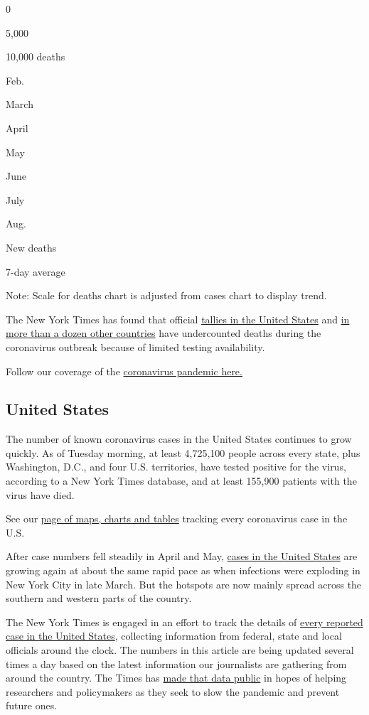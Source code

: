 0

5,000

10,000 deaths

Feb.

March

April

May

June

July

Aug.

New deaths

7-day average

Note: Scale for deaths chart is adjusted from cases chart to display
trend.

The New York Times has found that official
\href{https://www.nytimes.com/interactive/2020/04/28/us/coronavirus-death-toll-total.html}{tallies
in the United States} and
\href{https://www.nytimes.com/interactive/2020/04/21/world/coronavirus-missing-deaths.html}{in
more than a dozen other countries} have undercounted deaths during the
coronavirus outbreak because of limited testing availability.

Follow our coverage of the
\href{https://www.nytimes.com/2020/08/03/world/coronavirus-covid-19.html}{coronavirus
pandemic here.}

\hypertarget{united-states}{%
\subsection{United States}\label{united-states}}

The number of known coronavirus cases in the United States continues to
grow quickly. As of Tuesday morning, at least 4,725,100 people across
every state, plus Washington, D.C., and four U.S. territories, have
tested positive for the virus, according to a New York Times database,
and at least 155,900 patients with the virus have died.

See our
\href{https://www.nytimes.com/interactive/2020/us/coronavirus-us-cases.html}{page
of maps, charts and tables} tracking every coronavirus case in the U.S.

After case numbers fell steadily in April and May,
\href{https://www.nytimes.com/interactive/2020/us/coronavirus-us-cases.html}{cases
in the United States} are growing again at about the same rapid pace as
when infections were exploding in New York City in late March. But the
hotspots are now mainly spread across the southern and western parts of
the country.

The New York Times is engaged in an effort to track the details of
\href{https://www.nytimes.com/interactive/2020/us/coronavirus-us-cases.html}{every
reported case in the United States}, collecting information from
federal, state and local officials around the clock. The numbers in this
article are being updated several times a day based on the latest
information our journalists are gathering from around the country. The
Times has
\href{https://www.nytimes.com/article/coronavirus-county-data-us.html?action=click\&module=Spotlight\&pgtype=Homepage}{made
that data public} in hopes of helping researchers and policymakers as
they seek to slow the pandemic and prevent future ones.

